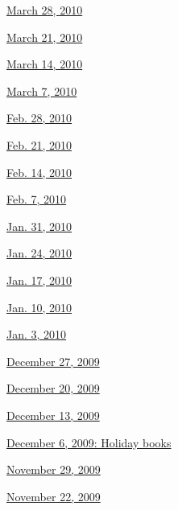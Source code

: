 \href{http://www.nytimes3xbfgragh.onion/indexes/2010/03/27/books/review/index.html}{March
28, 2010}

\href{http://www.nytimes3xbfgragh.onion/indexes/2010/03/20/books/review/index.html}{March
21, 2010}

\href{http://www.nytimes3xbfgragh.onion/indexes/2010/03/13/books/review/index.html}{March
14, 2010}

\href{http://www.nytimes3xbfgragh.onion/indexes/2010/03/06/books/review/index.html}{March
7, 2010}

\href{http://www.nytimes3xbfgragh.onion/indexes/2010/02/27/books/review/index.html}{Feb.
28, 2010}

\href{http://www.nytimes3xbfgragh.onion/indexes/2010/02/20/books/review/index.html}{Feb.
21, 2010}

\href{http://www.nytimes3xbfgragh.onion/indexes/2010/02/13/books/review/index.html}{Feb.
14, 2010}

\href{http://www.nytimes3xbfgragh.onion/indexes/2010/02/06/books/review/index.html}{Feb.
7, 2010}

\href{http://www.nytimes3xbfgragh.onion/indexes/2010/01/30/books/review/index.html}{Jan.
31, 2010}

\href{http://www.nytimes3xbfgragh.onion/indexes/2010/01/23/books/review/index.html}{Jan.
24, 2010}

\href{http://www.nytimes3xbfgragh.onion/indexes/2010/01/16/books/review/index.html}{Jan.
17, 2010}

\href{http://www.nytimes3xbfgragh.onion/indexes/2010/01/09/books/review/index.html}{Jan.
10, 2010}

\href{http://www.nytimes3xbfgragh.onion/indexes/2010/01/02/books/review/index.html}{Jan.
3, 2010}

\href{http://www.nytimes3xbfgragh.onion/indexes/2009/12/26/books/review/index.html}{December
27, 2009}

\href{http://www.nytimes3xbfgragh.onion/indexes/2009/12/19/books/review/index.html}{December
20, 2009}

\href{http://www.nytimes3xbfgragh.onion/indexes/2009/12/12/books/review/index.html}{December
13, 2009}

\href{http://www.nytimes3xbfgragh.onion/indexes/2009/12/05/books/review/index.html}{December
6, 2009: Holiday books}

\href{http://www.nytimes3xbfgragh.onion/indexes/2009/11/28/books/review/index.html}{November
29, 2009}

\href{http://www.nytimes3xbfgragh.onion/indexes/2009/11/21/books/review/index.html}{November
22, 2009}

